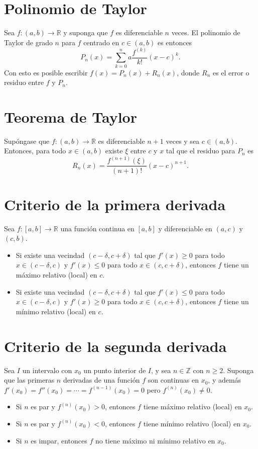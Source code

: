 \documentclass{article}
\begin{document}
\section*{Polinomio de Taylor}

Sea $f:(a,b)\to\mathbb{R}$ y suponga que $f$ es diferenciable $n$ veces. El polinomio de Taylor de grado $n$ para $f$ centrado en $c\in(a,b)$ es entonces
$$P_n(x)=\sum_{k=0}^{n}a \frac{f^{(k)}}{k!}(x-c)^k.$$
Con esto es posible escribir $f(x)=P_n(x)+R_n(x)$, donde $R_n$ es el error o residuo entre $f$ y $P_n$.

\section*{Teorema de Taylor}

Supóngase que $f:(a,b)\to\mathbb{R}$ es diferenciable $n+1$ veces y sea $c\in(a,b)$. Entonces, para todo $x\in(a,b)$ existe $\xi$ entre $c$ y $x$ tal que el residuo para $P_n$ es
$$R_n(x)=\frac{f^{(n+1)}(\xi)}{(n+1)!}(x-c)^{n+1}.$$

\section*{Criterio de la primera derivada}

Sea $f:[a,b]\to\mathbb{R}$ una función continua en $[a,b]$ y diferenciable en $(a,c)$ y $(c,b)$.
\begin{itemize}

\item Si existe una vecindad $(c-\delta,c+\delta)$ tal que $f'(x)\geq 0$ para todo $x\in(c-\delta,c)$ y $f'(x)\leq 0$ para todo $x\in(c,c+\delta)$, entonces $f$ tiene un máximo relativo (local) en $c$. 

\item Si existe una vecindad $(c-\delta,c+\delta)$ tal que $f'(x)\leq 0$ para todo $x\in(c-\delta,c)$ y $f'(x)\geq 0$ para todo $x\in(c,c+\delta)$, entonces $f$ tiene un mínimo relativo (local) en $c$. 

\end{itemize}

\section*{Criterio de la segunda derivada}

Sea $I$ un intervalo con $x_0$ un punto interior de $I$, y sea $n\in\mathbb{Z}$ con $n\geq 2$. Suponga que las primeras $n$ derivadas de una función $f$ son continuas en $x_0$, y además $f'(x_0)=f''(x_0)=\cdots=f^{(n-1)}(x_0)=0$ pero $f^{(n)}(x_0)\neq 0$. 
\begin{itemize}

\item Si $n$ es par y $f^{(n)}(x_0)>0$, entonces $f$ tiene máximo relativo (local) en $x_0$. 

\item Si $n$ es par y $f^{(n)}(x_0)<0$, entonces $f$ tiene mínimo relativo (local) en $x_0$. 

\item Si $n$ es impar, entonces $f$ no tiene máximo ni mínimo relativo en $x_0$.

\end{itemize}
\end{document}
